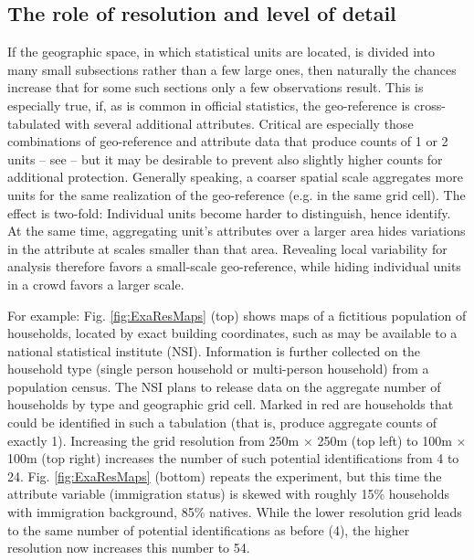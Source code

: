 \subsection{The role of resolution and level of detail} \label{sec:ident_detail}

If the geographic space, in which statistical units are located, is divided into many small subsections rather than a few large ones, then naturally the chances increase that for some such sections only a few observations result. This is especially true, if, as is common in official statistics, the geo-reference is cross-tabulated with several additional attributes.
Critical are especially those combinations of geo-reference and attribute data that produce counts of 1 or 2 units -- see \citet[5.2]{HundepoolEtAl2024} -- but it may be desirable to prevent also slightly higher counts for additional protection.
Generally speaking, a coarser spatial scale aggregates more units for the same realization of the geo-reference (e.g. in the same grid cell). The effect is two-fold: Individual units become harder to distinguish, hence identify. At the same time, aggregating unit's attributes over a larger area hides variations in the attribute at scales smaller than that area. Revealing local variability for analysis therefore favors a small-scale geo-reference, while hiding individual units in a crowd favors a larger scale.


For example: Fig. \ref{fig:ExaResMaps} (top) shows maps of a fictitious population of households, located by exact building coordinates, such as may be available to a national statistical institute (NSI). Information is further collected on the household type (single person household or multi-person household) from a population census. The NSI plans to release data on the aggregate number of households by type and geographic grid cell. Marked in red are households that could be identified in such a tabulation (that is, produce aggregate counts of exactly 1). 
Increasing the grid resolution from 250m $\times$ 250m (top left) to 100m $\times$ 100m (top right) increases the number of such potential identifications from 4 to 24. Fig. \ref{fig:ExaResMaps} (bottom) repeats the experiment, but this time the attribute variable (immigration status) is skewed  with roughly 15\% households with immigration background, 85\% natives. While the lower resolution grid leads to the same number of potential identifications as before (4), the higher resolution now increases this number to 54.


